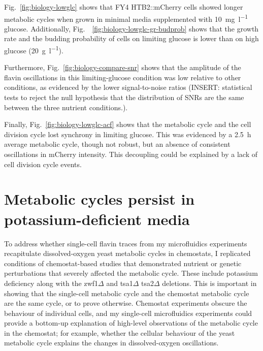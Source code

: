 Fig.\ \ref{fig:biology-lowglc} shows that FY4 HTB2::mCherry cells showed longer metabolic cycles when grown in minimal media supplemented with \SI{10}{\milli\gram~\litre^{-1}} glucose.
Additionally, Fig.\ ~\ref{fig:biology-lowglc-gr-budprob} shows that the growth rate and the budding probability of cells on limiting glucose is lower than on high glucose (\SI{20}{\gram~\litre^{-1}}).

Furthermore, Fig.\ \ref{fig:biology-compare-snr} shows that the amplitude of the flavin oscillations in this limiting-glucose condition was low relative to other conditions, as evidenced by the lower signal-to-noise ratios (INSERT: statistical tests to reject the null hypothesis that the distribution of SNRs are the same between the three nutrient conditions.).

Finally, Fig.\ \ref{fig:biology-lowglc-acf} shows that the metabolic cycle and the cell division cycle lost synchrony in limiting glucose.
This was evidenced by a \SI{2.5}{\hour} average metabolic cycle, though not robust, but an absence of consistent oscillations in mCherry intensity.
This decoupling could be explained by a lack of cell division cycle events.




\section{Metabolic cycles persist in potassium-deficient media}
\label{sec:biology-potassium_deficient}

To address whether single-cell flavin traces from my microfluidics experiments recapitulate dissolved-oxygen yeast metabolic cycles in chemostats, I replicated conditions of chemostat-based studies that demonstrated nutrient or genetic perturbations that severely affected the metabolic cycle.
These include potassium deficiency along with the zwf1$\Delta$ and tsa1$\Delta$ tsa2$\Delta$ deletions.
This is important in showing that the single-cell metabolic cycle and the chemostat metabolic cycle are the same cycle, or to prove otherwise.
Chemostat experiments obscure the behaviour of individual cells, and
my single-cell microfluidics experiments could provide a bottom-up explanation of high-level observations of the metabolic cycle in the chemostat; for example, whether the cellular behaviour of the yeast metabolic cycle explains the changes in dissolved-oxygen oscillations.


